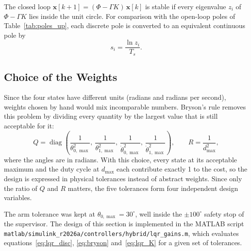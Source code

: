 \documentclass[a4paper,11pt]{article}
\begin{document}
The closed loop $\mathbf{x}[k+1] = (\Phi - \Gamma K)\,\mathbf{x}[k]$ is stable if every eigenvalue $z_i$ of $\Phi - \Gamma K$ lies inside the unit circle. For comparison with the open-loop poles of Table~\ref{tab:poles_up}, each discrete pole is converted to an equivalent continuous pole by
\begin{equation}
  s_i = \frac{\ln z_i}{T_s} .
  \label{eq:lqr_s}
\end{equation}

\subsection{Choice of the Weights}
\label{sec:lqr_bryson}
Since the four states have different units (radians and radians per second), weights chosen by hand would mix incomparable numbers. Bryson's rule removes this problem by dividing every quantity by the largest value that is still acceptable for it:
\begin{equation}
  Q = \operatorname{diag}\!\left( \frac{1}{\theta_{0,\max}^2},\ \frac{1}{\theta_{1,\max}^2},\ \frac{1}{\dot\theta_{0,\max}^2},\ \frac{1}{\dot\theta_{1,\max}^2} \right), \qquad R = \frac{1}{d_{\max}^2} ,
  \label{eq:bryson}
\end{equation}
where the angles are in radians. With this choice, every state at its acceptable maximum and the duty cycle at $d_{\max}$ each contribute exactly 1 to the cost, so the design is expressed in physical tolerances instead of abstract weights. Since only the ratio of $Q$ and $R$ matters, the five tolerances form four independent design variables.

The arm tolerance was kept at $\theta_{0,\max} = 30^\circ$, well inside the $\pm 100^\circ$ safety stop of the supervisor. The design of this section is implemented in the MATLAB script \nolinkurl{matlab/simulink_r2026a/controllers/hybrid/lqr_gains.m}, which evaluates equations~\ref{eq:lqr_disc}, \ref{eq:bryson} and~\ref{eq:lqr_K} for a given set of tolerances.
\end{document}
